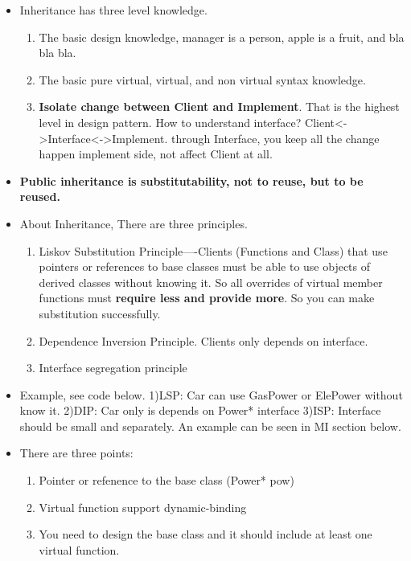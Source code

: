 \documentclass[a4paper,12pt,twoside]{book}
\begin{document}
\begin{itemize}
	\item Inheritance has three level knowledge.
	\begin{enumerate}
		\item The basic design knowledge, manager is a person, apple is a fruit, and bla bla bla.
		\item The basic  pure virtual, virtual, and non virtual syntax knowledge.
		\item \textbf{Isolate change between Client and Implement}. That is the highest level in design pattern. How to understand interface? Client<->Interface<->Implement. through Interface, you keep all the change happen implement side, not affect Client at all.
	\end{enumerate}
	
	\item \textbf{Public inheritance is substitutability, not to reuse, but to be reused. }
	\item About Inheritance, There are three principles.
	\begin{enumerate}
		\item Liskov Substitution Principle----Clients (Functions and Class) that use pointers or references to base classes must be able to use objects of derived classes without knowing it.  So all overrides of virtual member functions must \textbf{require less and provide more}. So you can make substitution successfully.
		
		\item Dependence Inversion Principle. Clients only depends on interface.
		\item Interface segregation principle
	\end{enumerate}
	
	\item Example, see code below.  1)LSP: Car can use  GasPower or ElePower without know it. 2)DIP: Car only is depends on Power* interface 3)ISP: Interface should be small and separately. An example can be seen in MI section below.
	
	\item There are three points:
	\begin{enumerate}
		\item Pointer or refenence to the base class (Power* pow)
		\item Virtual function support dynamic-binding
		\item You need to design the base class and it should include at least one virtual function.
	\end{enumerate}
	

\end{itemize}
\end{document}
